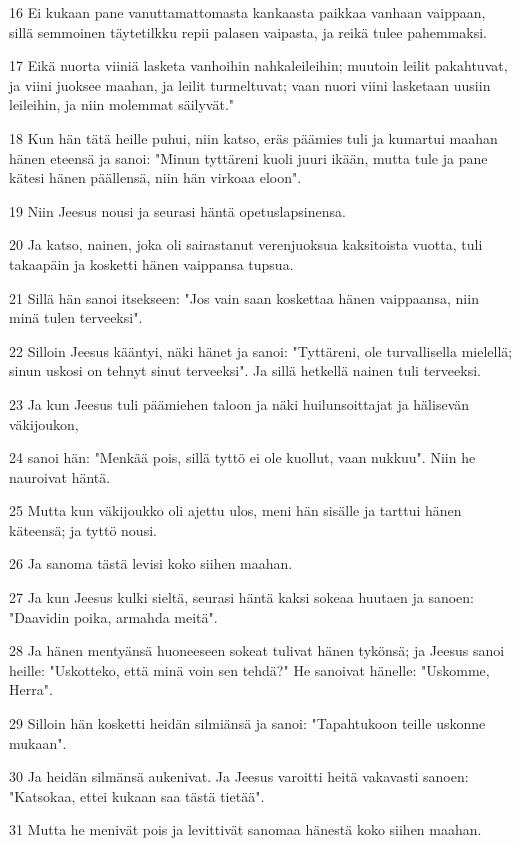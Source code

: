 \par 16 Ei kukaan pane vanuttamattomasta kankaasta paikkaa vanhaan vaippaan, sillä semmoinen täytetilkku repii palasen vaipasta, ja reikä tulee pahemmaksi.
\par 17 Eikä nuorta viiniä lasketa vanhoihin nahkaleileihin; muutoin leilit pakahtuvat, ja viini juoksee maahan, ja leilit turmeltuvat; vaan nuori viini lasketaan uusiin leileihin, ja niin molemmat säilyvät."
\par 18 Kun hän tätä heille puhui, niin katso, eräs päämies tuli ja kumartui maahan hänen eteensä ja sanoi: "Minun tyttäreni kuoli juuri ikään, mutta tule ja pane kätesi hänen päällensä, niin hän virkoaa eloon".
\par 19 Niin Jeesus nousi ja seurasi häntä opetuslapsinensa.
\par 20 Ja katso, nainen, joka oli sairastanut verenjuoksua kaksitoista vuotta, tuli takaapäin ja kosketti hänen vaippansa tupsua.
\par 21 Sillä hän sanoi itsekseen: "Jos vain saan koskettaa hänen vaippaansa, niin minä tulen terveeksi".
\par 22 Silloin Jeesus kääntyi, näki hänet ja sanoi: "Tyttäreni, ole turvallisella mielellä; sinun uskosi on tehnyt sinut terveeksi". Ja sillä hetkellä nainen tuli terveeksi.
\par 23 Ja kun Jeesus tuli päämiehen taloon ja näki huilunsoittajat ja hälisevän väkijoukon,
\par 24 sanoi hän: "Menkää pois, sillä tyttö ei ole kuollut, vaan nukkuu". Niin he nauroivat häntä.
\par 25 Mutta kun väkijoukko oli ajettu ulos, meni hän sisälle ja tarttui hänen käteensä; ja tyttö nousi.
\par 26 Ja sanoma tästä levisi koko siihen maahan.
\par 27 Ja kun Jeesus kulki sieltä, seurasi häntä kaksi sokeaa huutaen ja sanoen: "Daavidin poika, armahda meitä".
\par 28 Ja hänen mentyänsä huoneeseen sokeat tulivat hänen tykönsä; ja Jeesus sanoi heille: "Uskotteko, että minä voin sen tehdä?" He sanoivat hänelle: "Uskomme, Herra".
\par 29 Silloin hän kosketti heidän silmiänsä ja sanoi: "Tapahtukoon teille uskonne mukaan".
\par 30 Ja heidän silmänsä aukenivat. Ja Jeesus varoitti heitä vakavasti sanoen: "Katsokaa, ettei kukaan saa tästä tietää".
\par 31 Mutta he menivät pois ja levittivät sanomaa hänestä koko siihen maahan.
